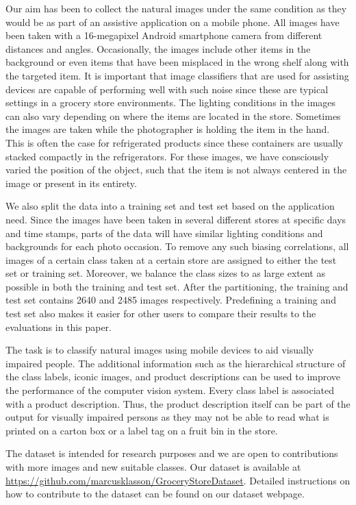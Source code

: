 Our aim has been to collect the natural images under the same condition as they would be as part of an assistive application on a mobile phone. All images have been taken with a 16-megapixel Android smartphone camera from different distances and angles. Occasionally, the images include other items in the background or even items that have been misplaced in the wrong shelf along with the targeted item. It is important that image classifiers that are used for assisting devices are capable of performing well with such noise since these are typical settings in a grocery store environments. The lighting conditions in the images can also vary depending on where the items are located in the store. 
Sometimes the images are taken while the photographer is holding the item in the hand. This is often the case for refrigerated products since these containers are usually stacked compactly in the refrigerators. For these images, we have consciously varied the position of the object, such that the item is not always centered in the image or present in its entirety. 

We also split the data into a training set and test set based on the application need. Since the images have been taken in several different stores at specific days and time stamps, 
parts of the data will have similar lighting conditions and backgrounds for each photo occasion. To remove any such biasing correlations, all images of a certain class taken at a certain store are assigned to either the test set or training set. Moreover, we balance the class sizes to as large extent as possible in both the training and test set. After the partitioning, the training and test set contains 2640 and 2485 images respectively. Predefining a training and test set also makes it easier for other users to compare their results to the evaluations in this paper.

The task is to classify natural images using mobile devices to aid visually impaired people. The additional information such as the hierarchical structure of the class labels, iconic images, and product descriptions can be used to improve the performance of the computer vision system. Every class label is associated with a product description. Thus, the product description itself can be part of the output for visually impaired persons as they may not be able to read what is printed on a carton box or a label tag on a fruit bin in the store.

The dataset is intended for research purposes and we are open to contributions with more images and new suitable classes. Our dataset is available at {\small \url{https://github.com/marcusklasson/GroceryStoreDataset}}. Detailed instructions on how to contribute to the dataset can be found on our dataset webpage.

